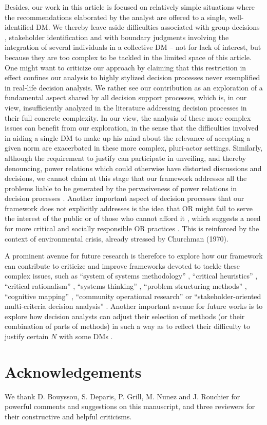 \documentclass[preprint, french, english, 11pt, authoryear]{elsarticle}%
\begin{document}
Besides, our work in this article is focused on relatively simple situations where the recommendations elaborated by the analyst are offered to a single, well-identified \ac{DM}.
We thereby leave aside difficulties associated with group decisions \citep{jackson_towards_1984}, stakeholder identification \citep{wang_systemic_2015} and with boundary judgments involving the integration of several individuals in a collective \ac{DM} \citep{midgley_systemic_2000}
-- not for lack of interest, but because they are too complex to be tackled in the limited space of this article. One might want to criticize our approach by claiming that this restriction in effect confines our analysis to highly stylized decision processes never exemplified in real-life decision analysis.
We rather see our contribution as an exploration of a fundamental aspect shared by all decision support processes, which is, in our view, insufficiently analyzed in the literature addressing decision processes in their full concrete complexity.
In our view, the analysis of these more complex issues can benefit from our exploration, in the sense that the difficulties involved in aiding a single \ac{DM} to make up his mind about the relevance of accepting a given norm are exacerbated in these more complex, pluri-actor settings. 
Similarly, although the requirement to justify can participate in unveiling, and thereby denouncing, power relations which could otherwise have distorted discussions and decisions, 
we cannot claim at this stage that our framework addresses all the problems liable to be generated by the pervasiveness of power relations in decision processes \citep{cronin_issues_2014}.
Another important aspect of decision processes that our framework does not explicitly addresses is the idea that \ac{OR} might fail to serve the interest of the public or of those who cannot afford it \citep{rosenhead_report_1986}, 
which suggests a need for more critical and socially responsible \ac{OR} practices \citep{jackson_systems_2000,ulrich_beyond_2003}. This is reinforced by the context of environmental crisis, already stressed by Churchman (1970).

A prominent avenue for future research is therefore to explore how our framework can contribute to criticize and improve frameworks devoted to tackle these complex issues, such as ``system of systems methodology'' \citep{jackson_towards_1984}, ``critical heuristics'' \citep{ulrich_critical_1987}, 
``critical rationalism'' \citep{ormerod_critical_2014}, ``systems thinking'' \citep{mingers_review_2010}, ``problem structuring methods'' \citep{hector_problem-structuring_2009}, ``cognitive mapping'' \citep{eden_analyzing_2004}, ``community operational research'' \citep{johnson_emerging_2018} or 
``stakeholder-oriented multi-criteria decision analysis'' \citep{de_brucker_multi-criteria_2013}. Another important avenue for future works is to explore how decision analysts can adjust their selection of methods (or their combination of parts of methods) in such a way as to reflect their difficulty to justify certain $N$ with some \acp{DM} \citep{mingers_towards_1997}.


\setcounter{secnumdepth}{0}
\section{Acknowledgements}
We thank D. Bouyssou, S. Deparis, P. Grill, M. Nunez and J. Rouchier for powerful comments and suggestions on this manuscript, and three reviewers for their constructive and helpful criticisms.


\end{document}
